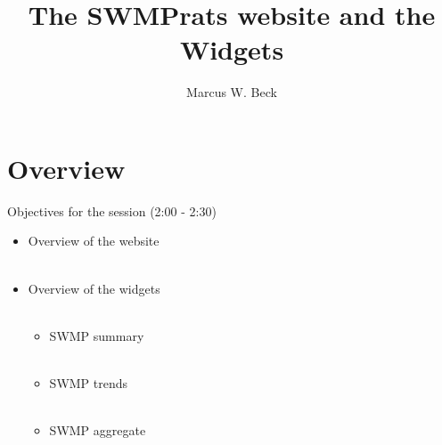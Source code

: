 \documentclass[xcolor=dvipsnames,serif]{beamer}\usepackage[]{graphicx}\usepackage[]{color}
\begin{document}
\title[SWMPrats, Widgets]{The SWMPrats website and the Widgets}

\author[M. Beck]{Marcus W. Beck}

\date{}







\section{Overview}

\begin{frame}{Objectives for the session (2:00 - 2:30)}
\begin{itemize}
\item Overview of the website \\~\\
\item Overview of the widgets \\~\\
\begin{itemize}
\item SWMP summary \\~\\
\item SWMP trends \\~\\
\item SWMP aggregate \\~\\
\end{itemize}
\end{itemize}
\end{frame}
\end{document}
